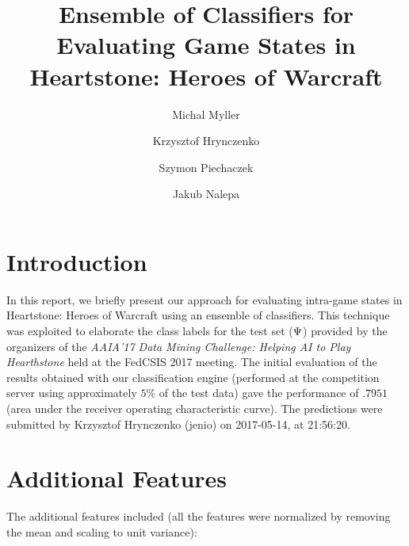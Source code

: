 \documentclass{svproc}
\begin{document}
\title{Ensemble of Classifiers for Evaluating Game States in Heartstone: Heroes of Warcraft}
\author{Michal Myller \and Krzysztof Hrynczenko \and Szymon Piechaczek \and Jakub Nalepa}
%

\maketitle

\section{Introduction} \label{sec:Introduction}

In this report, we briefly present our approach for evaluating intra-game states in Heartstone: Heroes of Warcraft using an ensemble of classifiers. This technique was exploited to elaborate the class labels for the test set ($\Psi$) provided by the organizers of the \emph{AAIA'17 Data Mining Challenge: Helping AI to Play Hearthstone} held at the FedCSIS 2017 meeting. The initial evaluation of the results obtained with our classification engine (performed at the competition server using approximately $5\%$ of the test data) gave the performance of $.7951$ (area under the receiver operating characteristic curve). The predictions were submitted by Krzysztof Hrynczenko (jenio) on 2017-05-14, at 21:56:20.

\section{Additional Features} \label{sec:AlgorithmDescription}

The additional features included (all the features were normalized by removing the mean and scaling to unit variance):
\end{document}
